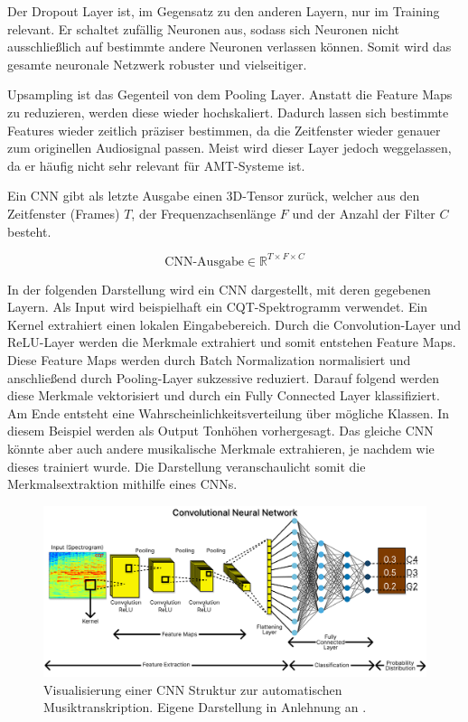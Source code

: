 Der Dropout Layer ist, im Gegensatz zu den anderen Layern, nur im Training relevant.
Er schaltet zufällig Neuronen aus,
sodass sich Neuronen nicht ausschließlich auf bestimmte andere Neuronen verlassen können.
Somit wird das gesamte neuronale Netzwerk robuster und vielseitiger.

Upsampling ist das Gegenteil von dem Pooling Layer.
Anstatt die Feature Maps zu reduzieren, werden diese wieder hochskaliert.
Dadurch lassen sich bestimmte Features wieder zeitlich präziser bestimmen,
da die Zeitfenster wieder genauer zum originellen Audiosignal passen.
Meist wird dieser Layer jedoch weggelassen, da er häufig nicht sehr relevant für AMT-Systeme ist.

Ein CNN gibt als letzte Ausgabe einen 3D-Tensor zurück,
welcher aus den Zeitfenster (Frames) $T$, der Frequenzachsenlänge $F$ und der Anzahl der Filter $C$ besteht.

\[
\text{CNN-Ausgabe} \in \mathbb{R}^{T \times F \times C}
\]

In der folgenden Darstellung wird ein CNN dargestellt, mit deren gegebenen Layern.
Als Input wird beispielhaft ein CQT-Spektrogramm verwendet.
Ein Kernel extrahiert einen lokalen Eingabebereich.
Durch die Convolution-Layer und ReLU-Layer werden die Merkmale extrahiert und somit entstehen Feature Maps.
Diese Feature Maps werden durch Batch Normalization normalisiert und anschließend durch Pooling-Layer sukzessive reduziert.
Darauf folgend werden diese Merkmale vektorisiert und durch ein Fully Connected Layer klassifiziert.
Am Ende entsteht eine Wahrscheinlichkeitsverteilung über mögliche Klassen.
In diesem Beispiel werden als Output Tonhöhen vorhergesagt.
Das gleiche CNN könnte aber auch andere musikalische Merkmale extrahieren, je nachdem wie dieses trainiert wurde.
Die Darstellung veranschaulicht somit die Merkmalsextraktion mithilfe eines CNNs.
\begin{figure}[H]
    \centering
    \includegraphics[width=1\textwidth]{Graphics/CNN}
    \caption[CNN Struktur]{Visualisierung einer CNN Struktur zur automatischen Musiktranskription. Eigene Darstellung in Anlehnung an  \cite{shahriar2020cnn}.}
    \label{fig:cnn-amt}
\end{figure}

